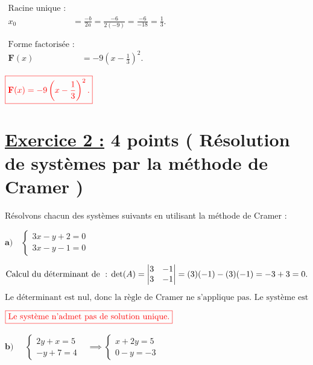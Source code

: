 \documentclass[12pt,a4paper]{article}
\begin{document}
\begin{enumerate}
\(
\begin{aligned}
\text{Racine unique :} \\
x_0 &= \frac{-b}{2a} = \frac{-6}{2(-9)} = \frac{-6}{-18} = \frac{1}{3}.
\end{aligned}
\)

\(
\begin{aligned}
\text{Forme factorisée :} \\
\textbf{F}(x) &= -9(x - \frac{1}{3})^2.
\end{aligned}
\)

\(
\textcolor{red}{\boxed{\textbf{F}(x) = -9\left(x - \frac{1}{3}\right)^2.}}
\)

\end{enumerate}


\section*{\underline{Exercice 2 :} 4 points ( Résolution de systèmes par la méthode de Cramer )}
Résolvons chacun des systèmes suivants en utilisant la méthode de Cramer :

\(\textbf{a)}\quad
\begin{cases}
3x - y + 2 = 0 \\
3x - y - 1 = 0
\end{cases}
\)


\(
\text{Calcul du déterminant de } : \\
\det(A) = \left| \begin{matrix} 3 & -1 \\ 3 & -1 \end{matrix} \right| = (3)(-1) - (3)(-1) = -3 + 3 = 0.
\)

\(
\text{Le déterminant est nul, donc la règle de Cramer ne s'applique pas. Le système est soit impossible, soit indéterminé.}
\)

\(
\textcolor{red}{\boxed{\text{Le système n'admet pas de solution unique.}}}\\
\)

\(\textbf{b)} \quad
\begin{aligned}
\begin{cases}
2y + x = 5 \\
-y + 7 = 4
\end{cases}&\implies
\begin{cases}
x+2y = 5 \\
0-y  = -3
\end{cases}
\end{aligned}
\)
\end{document}
